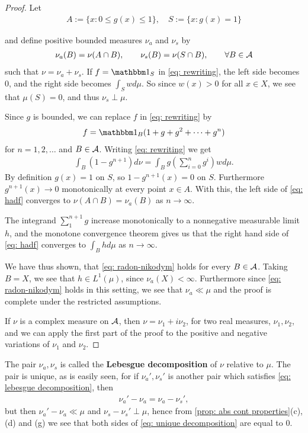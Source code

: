\begin{proof}
Let
\begin{align*}
	A:=\{x:0\le g(x) \le 1\}, \quad S:=\{x: g(x)=1 \}
\end{align*}

and define positive bounded measures $\nu_{a}$ and $\nu_{s}$ by
\begin{align*}
	\nu_{a}(B)=\nu(A\cap B), \qquad \nu_{s}(B)=\nu(S\cap B), \qquad \forall B\in \mathcal{A}
\end{align*}
such that $\nu=\nu_{a}+\nu_{s}$.
If $f=\ind{S}$ in \eqref{eq: rewriting}, the left side becomes $0$, and the right side becomes $\int_{S}wd\mu$. So since $w(x)>0$ for all $x\in X$, we see that $\mu(S)=0$, and thus $\nu_{s} \perp \mu$.

Since $g$ is bounded, we can replace $f$ in \eqref{eq: rewriting} by
\begin{align*}
	f=\ind{B}(1+g+g^{2}+\dots+g^{n})
\end{align*}
for $n=1,2, \dots$ and $B\in \mathcal{A}$. Writing \eqref{eq: rewriting} we get
\begin{align}
	\int_{B}(1-g^{n+1})d\nu = \int_{B}g\left(\sum_{i=0}^{n}g^{i}\right)wd\mu. \label{eq: hadf}
\end{align}
By definition $g(x)=1$ on $S$, so $1-g^{n+1}(x)=0$ on $S$. Furthermore $g^{n+1}(x)\to 0$ monotonically at every point $x\in A$. With this, the left side of \eqref{eq: hadf} converges to $\nu(A\cap B)=\nu_{a}(B)$ as $n\to \infty$.

The integrand $\sum_{1}^{n+1}g$ increase monotonically to a nonnegative measurable limit $h$, and the monotone convergence theorem gives us that the right hand side of \eqref{eq: hadf} converges to $\int_{B}hd\mu$ as $n\to \infty$.

We have thus shown, that \eqref{eq: radon-nikodym} holds for every $B\in \mathcal{A}$. Taking $B=X$, we see that $h\in L^{1}(\mu)$, since $\nu_{a}(X)<\infty$. Furthermore since \eqref{eq: radon-nikodym} holds in this setting, we see that $\nu_{a}\ll \mu$ and the proof is complete under the restricted assumptions.

If $\nu$ is a complex measure on $\mathcal{A}$, then $\nu=\nu_{1}+i\nu_{2}$, for two real measures, $\nu_{1}, \nu_{2}$, and we can apply the first part of the proof to the positive and negative variations of $\nu_{1}$ and $\nu_{2}$. %
\end{proof}



The pair $\nu_{a}, \nu_{s}$ is called the \textbf{Lebesgue decomposition} of $\nu$ relative to $\mu$. The pair is unique, as is easily seen, for if $\nu_{a}',\nu_{s}'$ is another pair which satisfies \eqref{eq: lebesgue decomposition}, then
\begin{align}
	\nu_{a}'-\nu_{a}=\nu_{a}-\nu_{s}', \label{eq: unique decomposition}
\end{align}
but then $\nu_{a}'-\nu_{a}\ll \mu$ and $\nu_{s}-\nu_{s}'\perp \mu$, hence from \cref{prop: abs cont properties}(c), (d) and (g) we see that both sides of \eqref{eq: unique decomposition} are equal to 0.

